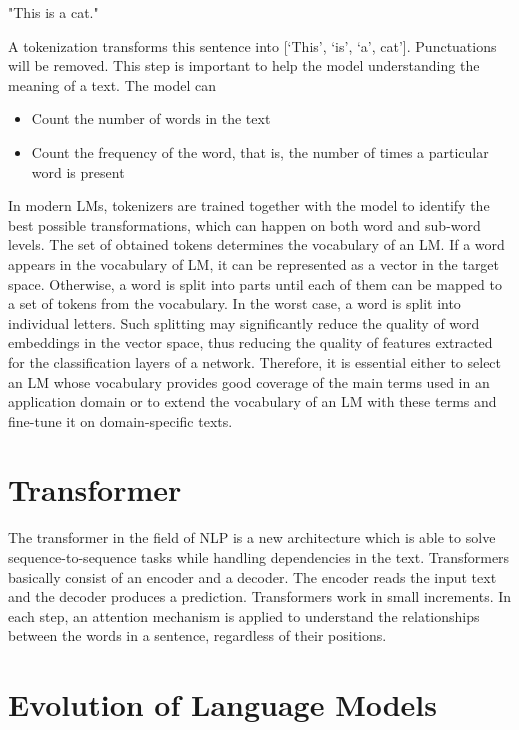 \centerline{"This is a cat."} 

A tokenization transforms this sentence into [‘This’, ‘is’, ‘a’, cat’]. Punctuations will be removed. This step is important to help the model understanding the meaning of a text. The model can
\begin{itemize}
	\item Count the number of words in the text
	\item Count the frequency of the word, that is, the number of times a particular word is present
\end{itemize} 

In modern LMs, tokenizers are trained together with the model to identify the best possible transformations, which can happen on both word and sub-word levels. The set of obtained tokens determines the vocabulary of an LM. If a word appears in the vocabulary of LM, it can be represented as a vector in the target space. Otherwise, a word is split into parts until each of them can be mapped to a set of tokens from the vocabulary. In the worst case, a word is split into individual letters. Such splitting may significantly reduce the quality of word embeddings in the vector space, thus reducing the quality of features extracted for the classification layers of a network. Therefore, it is essential either to select an LM whose vocabulary provides good coverage of the main terms used in an application domain or to extend the vocabulary of an LM with these terms and fine-tune it on domain-specific texts. 

\section{Transformer}
The transformer in the field of NLP is a new architecture which is able to solve sequence-to-sequence tasks while handling dependencies in the text. Transformers basically consist of an encoder and a decoder. The encoder reads the input text and the decoder produces a prediction. Transformers work in small increments. In each step, an attention mechanism is applied to understand the relationships between the words in a sentence, regardless of their positions. 

\section{Evolution of Language Models}
